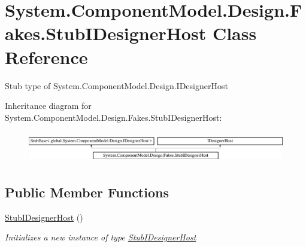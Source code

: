 \hypertarget{class_system_1_1_component_model_1_1_design_1_1_fakes_1_1_stub_i_designer_host}{\section{System.\-Component\-Model.\-Design.\-Fakes.\-Stub\-I\-Designer\-Host Class Reference}
\label{class_system_1_1_component_model_1_1_design_1_1_fakes_1_1_stub_i_designer_host}
}


Stub type of System.\-Component\-Model.\-Design.\-I\-Designer\-Host 


Inheritance diagram for System.\-Component\-Model.\-Design.\-Fakes.\-Stub\-I\-Designer\-Host\-:\begin{figure}[H]
\begin{center}
\leavevmode
\includegraphics[height=1.389578cm]{class_system_1_1_component_model_1_1_design_1_1_fakes_1_1_stub_i_designer_host}
\end{center}
\end{figure}
\subsection*{Public Member Functions}
\begin{DoxyCompactItemize}
\item 
\hyperlink{class_system_1_1_component_model_1_1_design_1_1_fakes_1_1_stub_i_designer_host_a208043ae9f128ded593bc0b8d408ed74}{Stub\-I\-Designer\-Host} ()
\begin{DoxyCompactList}\small\item\em Initializes a new instance of type \hyperlink{class_system_1_1_component_model_1_1_design_1_1_fakes_1_1_stub_i_designer_host}{Stub\-I\-Designer\-Host}\end{DoxyCompactList}\end{DoxyCompactItemize}
